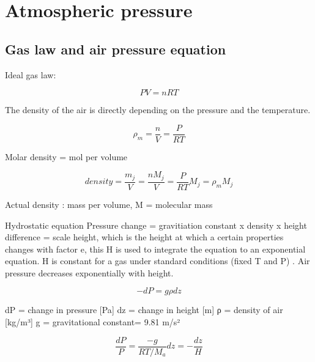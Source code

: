\documentclass[oneside]{book}
\begin{document}

\section{Atmospheric pressure}\label{atmospheric-pressure}

\subsection{Gas law and air pressure
equation}\label{gas-law-and-air-pressure-equation}

Ideal gas law:

\begin{equation} 
  PV = nRT
   \label{eq:Eqgaslaw}
\end{equation}

The density of the air is directly depending on the pressure and the
temperature.

\begin{equation} 
  \rho_m = \frac{n}{V} = \frac{P}{RT}
  \label{eq:Eqairdensity}
\end{equation}

Molar density = mol per volume

\begin{equation} 
  density = \frac{m_j}{V} = \frac{nM_j}{V} = \frac{P}{RT}M_j = \rho_m M_j
   \label{eq:Eqdensity}
\end{equation}

Actual density : mass per volume, M = molecular mass

Hydrostatic equation Pressure change = gravitiation constant x density x
height difference = scale height, which is the height at which a certain
properties changes with factor e, this H is used to integrate the
equation to an exponential equation. H is constant for a gas under
standard conditions (fixed T and P) . Air pressure decreases
exponentially with height.

\begin{equation} 
  -dP = g \rho dz
   \label{eq:Eqhydrostatic}
\end{equation}

dP = change in pressure {[}Pa{]} dz = change in height {[}m{]} ρ =
density of air {[}kg/m³{]} g = gravitational constant= 9.81 m/s²

\begin{equation} 
  \frac{dP}{P} = \frac{-g}{RT / M_a}  dz = - \frac{dz}{H}
   \label{eq:Eqhydrostatic2}
\end{equation}
\end{document}
